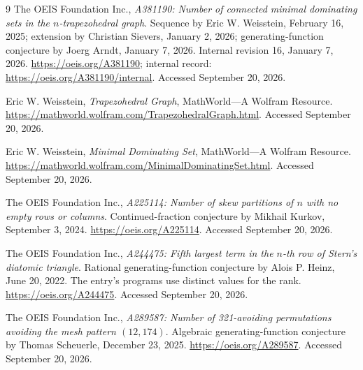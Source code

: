 \documentclass[11pt,letterpaper]{article}
\numberwithin{equation}{section}
\theoremstyle{definition}
\theoremstyle{remark}
\begin{document}
\clearpage
\begingroup
\small
\setlength{\parskip}{0pt}
\begin{thebibliography}{9}
\setlength{\itemsep}{2pt}
The OEIS Foundation Inc., \emph{A381190: Number of connected minimal
dominating sets in the $n$-trapezohedral graph}. Sequence by
Eric W. Weisstein, February 16, 2025; extension by Christian Sievers,
January 2, 2026; generating-function conjecture by Joerg Arndt,
January 7, 2026. Internal revision 16, January 7, 2026.
\url{https://oeis.org/A381190}; internal record:
\url{https://oeis.org/A381190/internal}. Accessed September 20, 2026.

Eric W. Weisstein, \emph{Trapezohedral Graph}, MathWorld---A Wolfram
Resource. \url{https://mathworld.wolfram.com/TrapezohedralGraph.html}.
Accessed September 20, 2026.

Eric W. Weisstein, \emph{Minimal Dominating Set}, MathWorld---A Wolfram
Resource. \url{https://mathworld.wolfram.com/MinimalDominatingSet.html}.
Accessed September 20, 2026.

The OEIS Foundation Inc., \emph{A225114: Number of skew partitions of
$n$ with no empty rows or columns}. Continued-fraction conjecture by
Mikhail Kurkov, September 3, 2024.
\url{https://oeis.org/A225114}. Accessed September 20, 2026.

The OEIS Foundation Inc., \emph{A244475: Fifth largest term in the
$n$-th row of Stern's diatomic triangle}. Rational generating-function
conjecture by Alois P. Heinz, June 20, 2022. The entry's programs
use distinct values for the rank.
\url{https://oeis.org/A244475}. Accessed September 20, 2026.

The OEIS Foundation Inc., \emph{A289587: Number of 321-avoiding
permutations avoiding the mesh pattern $(12,174)$}. Algebraic
generating-function conjecture by Thomas Scheuerle, December 23, 2025.
\url{https://oeis.org/A289587}. Accessed September 20, 2026.
\end{thebibliography}
\endgroup
\end{document}
